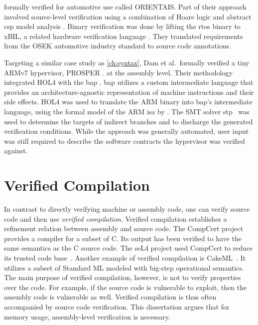 \citet{shi2012orientais} formally verified  for automotive use
called ORIENTAIS.
Part of their approach involved source-level verification
using a combination of Hoare logic
and abstract \ac{csp} model analysis \citep{hoare1978csp}.
Binary verification was done by lifting the \ac{rtos} binary to xBIL,
a related hardware verification language \citep{shi2012xbil}.
They translated requirements from the OSEK automotive industry standard to source code annotations.

Targeting a similar case study as \cref{ch:syntax},
Dam et al.\ formally verified a tiny ARMv7 hypervisor, PROSPER \citep{dam2013hypervisor,baumann2016high}.
at the assembly level.
Their methodology integrated HOL4 with the \ac{bap} \citep{brumley2011bap}.
\Ac{bap} utilizes a custom intermediate language
that provides an architecture-agnostic representation of machine instructions
and their side effects.
HOL4 was used to translate the ARM binary into \ac{bap}'s intermediate language,
using the formal model of the ARM \ac{isa} by \citet{fox2010arm}.
The SMT solver \ac{stp}~\citep{ganesh2007stp}
was used to determine the targets of indirect branches
and to discharge the generated verification conditions.
While the approach was generally automated,
user input was still required to describe the software contracts
the hypervisor was verified against.

\section{Verified Compilation}
In contrast to directly verifying machine or assembly code, one can verify source code and then use \emph{verified compilation}.%
Verified compilation establishes a refinement relation between assembly and source code.
The CompCert project~\citep{leroy:compcert} provides a compiler for a subset of C.
Its output has been verified to have the same semantics as the C source code.
The seL4 project used CompCert to reduce its trusted code base~\citep{Klein_AEMSKH_14}.
Another example of verified compilation is CakeML~\citep{kumar2014cakeml}.
It utilizes a subset of Standard ML modeled with big-step operational semantics.
The main purpose of verified compilation, however, is not to verify properties over the code.
For example, if the source code is vulnerable to  exploit,
then the assembly code is vulnerable as well.
Verified compilation is thus often accompanied by source code verification.
This dissertation argues that for memory usage, assembly-level verification is necessary.

